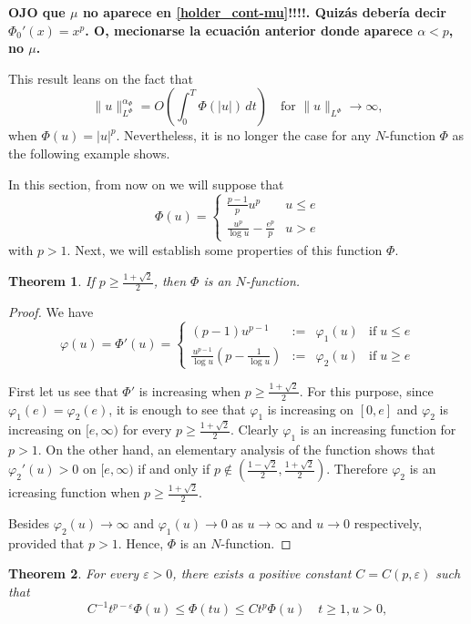 \documentclass[twoside]{article}
\newtheorem{thm}{Theorem}[section]
\theoremstyle{remark}
\newcommand{\orlnor}{\|_{L^{\Phi}}}
\renewcommand{\leq}{\leqslant}
\renewcommand{\geq}{\geqslant}
\begin{document}
{\bf OJO que $\mu$ no aparece en \eqref{holder_cont-mu}!!!!. Quiz\'as deber\'ia decir $\Phi_0'(x)=x^p$. O, mecionarse la ecuaci\'on anterior donde aparece $\alpha<p$, no $\mu$.}

This result leans on the  fact that
\begin{equation}
 \|u\orlnor^{\alpha_{\Phi}}=O\left(\int_0^T \Phi(|u|)\,dt\right)\quad\text{for } \|u\orlnor\to\infty,
\end{equation}
when  $\Phi(u)=|u|^p$.
Nevertheless, it is no longer the case  for any $N$-function $\Phi$ as the following example shows.

In this section, from now on we will suppose that
\[\Phi(u)=
\left\{
\begin{array}{ll}
\frac{p-1}{p}u^p&u\leq e
\\
\frac{u^p}{\log u}-\frac{e^p}{p}&u>e
\end{array}
\right.\]
with $p>1$. Next, we will establish some properties of this function $\Phi$.

\begin{thm}
If $p\geq \frac{1+\sqrt 2}{2}$, then $\Phi$ is an $N$-function.
\end{thm}


\begin{proof}
We have
\[\varphi(u)=\Phi'(u)=\left\{
\begin{array}{cccc}
(p-1)u^{p-1}&:=&\varphi_1(u)& \mbox{if}\;u\leq e
\\
\frac{u^{p-1}}{\log u}(p-\frac{1}{\log u})&:=&\varphi_2(u)&\mbox{if}\; u\geq e
\end{array}
\right.
\]

First let us see that $\Phi'$ is increasing when $p\geq \frac{1+\sqrt {2}}{2}$.
For this purpose, since $\varphi_1(e)=\varphi_2(e)$, it is enough to see that $\varphi_1$ is increasing  on $[0,e]$ and $\varphi_2$ is increasing on
$[e,\infty)$ for every $p\geq \frac{1+\sqrt {2}}{2}$. Clearly
$\varphi_1$ is an increasing function for $p>1$.  On the other hand, an elementary analysis of the function shows that
$\varphi_2'(u)>0$ on $[e,\infty)$ if and only if
 $p \notin(\frac{1-\sqrt2}{2},\frac{1+\sqrt2}{2})$.  Therefore $\varphi_2$ is an icreasing function when $p\geq \frac{1+\sqrt2}{2}$.

 Besides $\varphi_2(u)\to \infty$ and  $\varphi_1(u)\to 0$  as $u \to  \infty$ and $u\to 0$  respectively, provided that $p>1$. Hence, $\Phi$ is an $N$-function.
\end{proof}


\begin{thm} For every $\varepsilon>0$, there exists a positive constant $C=C(p,\varepsilon)$  such that
\begin{equation}\label{cota-sup-indices}
C^{-1}t^{p-\varepsilon}\Phi(u)\leq \Phi(tu) \leq Ct^p\Phi(u)\quad t\geq 1, u>0,
\end{equation}
\end{thm}
\end{document}
